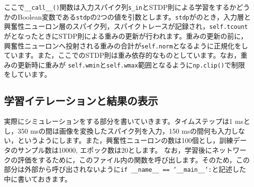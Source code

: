 ここで\texttt{\_\_call\_\_()}関数は入力スパイク列\texttt{s\_in}とSTDP則による学習をするかどうかのBoolean変数である\texttt{stdp}の2つの値を引数とします。\texttt{stdp}がのとき，入力層と興奮性ニューロン層のスパイク列，スパイクトレースが記録され，\texttt{self.tcount}がとなったときにSTDP則による重みの更新が行われます。重みの更新の前に，興奮性ニューロンへ投射される重みの合計が\texttt{self.norm}となるように正規化をしています。また，ここでのSTDP則は重み依存的なものとしています。なお，重みの更新時に重みが
\texttt{self.wmin}と\texttt{self.wmax}範囲となるように\texttt{np.clip()}で制限をしています。
\subsection{学習イテレーションと結果の表示}
実際にシミュレーションをする部分を書いていきます。タイムステップは1 msとし，350 msの間は画像を変換したスパイク列を入力，150 msの間何も入力しない，というようにします。また，興奮性ニューロンの数は100個とし，訓練データのサンプル数は10000, エポック数は20とします。
なお，学習後にネットワークの評価をするために，このファイル内の関数を呼び出します。そのため，この部分は外部から呼び出されないように\texttt{if \_\_name\_\_ == '\_\_main\_\_':}と記述した中に書いておきます。
